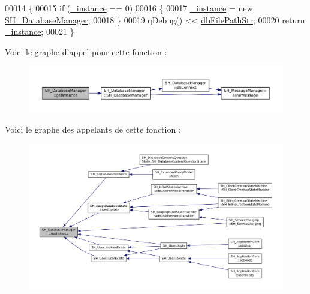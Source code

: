 \begin{DoxyCode}
00014 \{
00015     \textcolor{keywordflow}{if} (\hyperlink{classSH__DatabaseManager_a8ca37d0cafa6a181582d60e045a8d5ab}{\_instance} == 0)
00016     \{
00017         \hyperlink{classSH__DatabaseManager_a8ca37d0cafa6a181582d60e045a8d5ab}{\_instance} = \textcolor{keyword}{new} \hyperlink{classSH__DatabaseManager_a7b5d0e372c153eb59cdab98588994904}{SH\_DatabaseManager};
00018     \}
00019     qDebug() << \hyperlink{SH__DatabaseManager_8h_acee79beb6e5aec996fd46b84264d072a}{dbFilePathStr};
00020     \textcolor{keywordflow}{return} \hyperlink{classSH__DatabaseManager_a8ca37d0cafa6a181582d60e045a8d5ab}{\_instance};
00021 \}
\end{DoxyCode}


Voici le graphe d'appel pour cette fonction \-:\nopagebreak
\begin{figure}[H]
\begin{center}
\leavevmode
\includegraphics[width=350pt]{classSH__DatabaseManager_a31198eb4de0f8b18e3fa0eed09f24d19_cgraph}
\end{center}
\end{figure}




Voici le graphe des appelants de cette fonction \-:
\nopagebreak
\begin{figure}[H]
\begin{center}
\leavevmode
\includegraphics[width=350pt]{classSH__DatabaseManager_a31198eb4de0f8b18e3fa0eed09f24d19_icgraph}
\end{center}
\end{figure}


